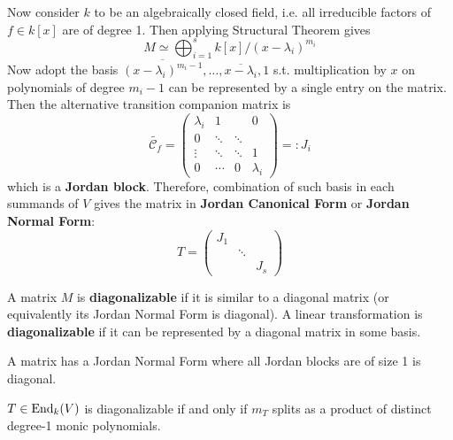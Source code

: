 \documentclass{article}
\begin{document}
Now consider $k$ to be an algebraically closed field, i.e. all irreducible factors of $f\in k[x]$ are of degree 1. Then applying Structural Theorem gives
\[
    M \simeq \bigoplus_{i=1}^s k[x]/(x - \lambda_i)^{m_i}
\]
Now adopt the basis $\overline{(x - \lambda_i)^{m_i - 1}}, \ldots, \overline{x - \lambda_i}, 1$ s.t. multiplication by $x$ on polynomials of degree $m_i - 1$ can be represented by a single entry on the matrix. Then the alternative transition companion matrix is
\[
    \widetilde{\mathcal{C}_f} = \begin{pmatrix}
        \lambda_i & 1 & & 0 \\
        0 & \ddots & \ddots & \\
        \vdots & \ddots & \ddots & 1 \\
        0 & \cdots & 0 & \lambda_i
    \end{pmatrix} =: J_i
\]
which is a \textbf{Jordan block}. Therefore, combination of such basis in each summands of $V$ gives the matrix in \textbf{Jordan Canonical Form} or \textbf{Jordan Normal Form}:
\[
    T = \begin{pmatrix}
        J_1 & & \\
        & \ddots & \\
        & & J_s
    \end{pmatrix}
\]

\begin{definition}
    A matrix $M$ is \textbf{diagonalizable} if it is similar to a diagonal matrix (or equivalently its Jordan Normal Form is diagonal). A linear transformation is \textbf{diagonalizable} if it can be represented by a diagonal matrix in some basis. 
\end{definition}

\begin{remark}
    A matrix has a Jordan Normal Form where all Jordan blocks are of size 1 is diagonal.
\end{remark}

\begin{proposition}
    $T\in\mathrm{End}_k(V)$ is diagonalizable if and only if $m_T$ splits as a product of distinct degree-1 monic polynomials.
\end{proposition}
\end{document}
